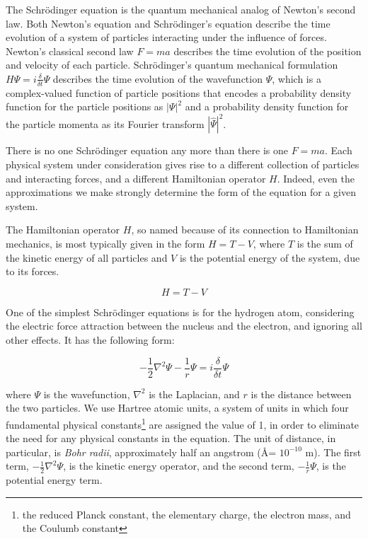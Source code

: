 \documentclass{article}
\begin{document}
The Schr\"odinger equation is the quantum mechanical analog of Newton's second law.
Both Newton's equation and Schr\"odinger's equation
describe the time evolution of a system
of particles interacting under the influence of forces.
Newton's classical second law $F=ma$
describes the time evolution of the position and velocity of each particle.
Schr\"odinger's quantum mechanical formulation $H\Psi=i\frac{\delta}{\delta t} \Psi$
describes the time evolution
of the wavefunction $\Psi$, which is a complex-valued function of particle positions
that encodes a probability density function for
the particle positions as $|\Psi|^2$ and a probability density function
for the particle momenta as its Fourier transform $|\hat{\Psi}|^2$.

There is no one Schr\"odinger equation any more than there is one $F=ma$.
Each physical system under consideration gives rise to a different collection
of particles and interacting forces, and a different Hamiltonian operator $H$.
Indeed, even the approximations we
make strongly determine the form of the equation for a given system.

The Hamiltonian operator $H$, so named because of its connection to Hamiltonian
mechanics, is most typically given in the form $H=T-V$, where $T$ is the
sum of the kinetic energy of all particles and $V$ is the potential energy
of the system, due to its forces.

\begin{equation*}
H=T-V
\end{equation*}

One of the simplest Schr\"odinger equations is for the hydrogen atom,
considering the electric force attraction between the nucleus and
the electron, and ignoring all other effects.  It has the following form:

\begin{equation*}
-\frac{1}{2}\nabla^2 \Psi - \frac{1}{r}\Psi = i \frac{\delta}{\delta t} \Psi
\end{equation*}

where $\Psi$ is the wavefunction, $\nabla^2$ is the Laplacian,
and $r$ is the distance between the two particles.  We use Hartree atomic units,
a system of units in which four fundamental physical constants\footnote{the reduced Planck
constant, the elementary charge, the electron mass, and the Coulumb constant} are
assigned the value of 1, in order to eliminate the need for any
physical constants in the equation.  The unit of distance, in particular,
is {\it Bohr radii}, approximately half an angstrom (\AA = $10^{-10}$ m).
The first term, $-\frac{1}{2}\nabla^2 \Psi$,
is the kinetic energy operator, and the second term, $-\frac{1}{r}\Psi$, is
the potential energy term.
\end{document}
